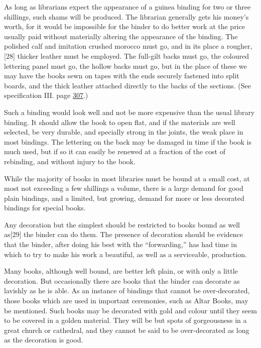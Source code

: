 \documentclass[
]{article}
\begin{document}
As long as librarians expect the appearance of a guinea binding for two
or three shillings, such shams will be produced. The librarian generally
gets his money's worth, for it would be impossible for the binder to do
better work at the price usually paid without materially altering the
appearance of the binding. The polished calf and imitation crushed
morocco must go, and in its place a
rougher,{\protect\hypertarget{Page_28}{}{{[}28{]}}} thicker leather must
be employed. The full-gilt backs must go, the coloured lettering panel
must go, the hollow backs must go, but in the place of these we may have
the books sewn on tapes with the ends securely fastened into split
boards, and the thick leather attached directly to the backs of the
sections. (See specification III. page
\protect\hyperlink{Page_307}{307}.)

Such a binding would look well and not be more expensive than the usual
library binding. It should allow the book to open flat, and if the
materials are well selected, be very durable, and specially strong in
the joints, the weak place in most bindings. The lettering on the back
may be damaged in time if the book is much used, but if so it can easily
be renewed at a fraction of the cost of rebinding, and without injury to
the book.

While the majority of books in most libraries must be bound at a small
cost, at most not exceeding a few shillings a volume, there is a large
demand for good plain bindings, and a limited, but growing, demand for
more or less decorated bindings for special books.

Any decoration but the simplest should be restricted to books bound as
well as{\protect\hypertarget{Page_29}{}{{[}29{]}}} the binder can do
them. The presence of decoration should be evidence that the binder,
after doing his best with the ``forwarding,'' has had time in which to
try to make his work a beautiful, as well as a serviceable, production.

Many books, although well bound, are better left plain, or with only a
little decoration. But occasionally there are books that the binder can
decorate as lavishly as he is able. As an instance of bindings that
cannot be over-decorated, those books which are used in important
ceremonies, such as Altar Books, may be mentioned. Such books may be
decorated with gold and colour until they seem to be covered in a golden
material. They will be but spots of gorgeousness in a great church or
cathedral, and they cannot be said to be over-decorated as long as the
decoration is good.
\end{document}
